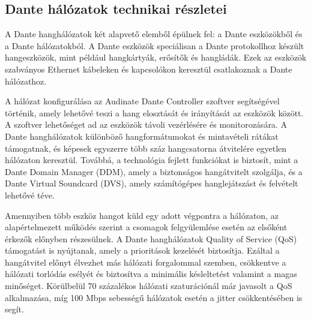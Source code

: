 \subsection{Dante hálózatok technikai részletei}
A Dante hanghálózatok két alapvető elemből épülnek fel: a Dante eszközökből és a Dante hálózatokból. 
A Dante eszközök speciálisan a Dante protokollhoz készült hangeszközök, mint például hangkártyák, erősítők és hangládák. 
Ezek az eszközök szabványos Ethernet kábeleken és kapcsolókon keresztül csatlakoznak a Dante hálózathoz. 

A hálózat konfigurálása az Audinate Dante Controller szoftver segítségével történik, amely lehetővé teszi a hang elosztását és 
irányítását az eszközök között. A szoftver lehetőséget ad az eszközök távoli vezérlésére és monitorozására. 
A Dante hanghálózatok különböző hangformátumokat és mintavételi rátákat támogatnak, és képesek egyszerre több száz hangcsatorna 
átvitelére egyetlen hálózaton keresztül. Továbbá, a technológia fejlett funkciókat is biztosít, mint a Dante Domain Manager (DDM), 
amely a biztonságos hangátvitelt szolgálja, és a Dante Virtual Soundcard (DVS), amely számítógépes hanglejátszást és felvételt 
lehetővé téve.

Amennyiben több eszköz hangot küld egy adott végpontra a hálózaton, az alapértelmezett működés szerint a csomagok felgyülemlése 
esetén az elsőként érkezők előnyben részesülnek. A Dante hanghálózatok Quality of Service (QoS) támogatást is nyújtanak, 
amely a prioritások kezelését biztosítja. Ezáltal a hangátvitel előnyt élvezhet más hálózati forgalommal szemben, csökkentve 
a hálózati torlódás esélyét és biztosítva a minimális késleltetést valamint a magas minőséget. Körülbelül 70 százalékos 
hálózati szaturációnál már javasolt a QoS alkalmazása, míg 100 Mbps sebességű hálózatok esetén a jitter csökkentésében is 
segít.
